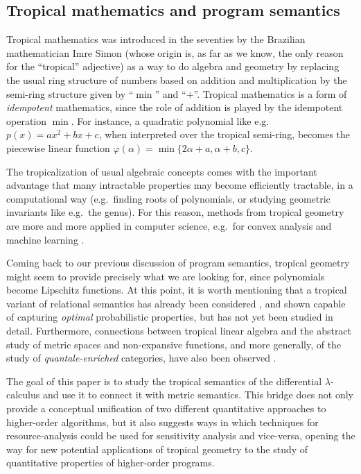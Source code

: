 \subsection{Tropical mathematics and program semantics } 


Tropical mathematics was introduced in the seventies by the Brazilian mathematician Imre Simon (whose origin is, as far as we know, the only reason for the ``tropical'' adjective) as a way to do algebra and geometry by replacing the usual ring structure of numbers based on addition and multiplication by the semi-ring structure given by ``$\min$'' and ``$+$''.
%
%
Tropical mathematics is a form of \emph{idempotent} mathematics, since the role of addition is 
played by the idempotent operation $\min$.
For instance, a quadratic polynomial like e.g.~$p(x)=ax^{2}+bx+c$, when interpreted over the tropical semi-ring, becomes the piecewise linear function
$
\varphi(\alpha)=\min\{2\alpha + a, \alpha+b, c\}
$.

The tropicalization of usual algebraic concepts comes with the important advantage that many intractable properties may become efficiently tractable, in a computational way (e.g.~finding roots of polynomials, or studying geometric invariants like e.g.~the genus). For this reason, methods from tropical geometry are more and more applied in computer science, e.g.~for convex analysis and machine learning \cite{}.

Coming back to our previous discussion of program semantics, tropical geometry might seem to provide precisely what we are looking for, since polynomials become Lipschitz functions.
At this point, it is worth mentioning that a tropical variant of relational semantics has already been considered \cite{}, and shown capable of capturing \emph{optimal} probabilistic properties, but has not yet been studied in detail. Furthermore, connections between tropical linear algebra and the abstract study of metric spaces and non-expansive functions, and more generally, of the study of \emph{quantale-enriched} categories, have also been observed \cite{}.

The goal of this paper is to study the tropical semantics of the differential $\lambda$-calculus and use it to connect it with metric semantics. This bridge does not only provide a conceptual unification of two different quantitative approaches to higher-order algorithms, but it also 
suggests ways in which techniques for resource-analysis could be used for sensitivity analysis and vice-versa, opening the way for new potential applications of tropical geometry to the study of quantitative properties of higher-order programs.


